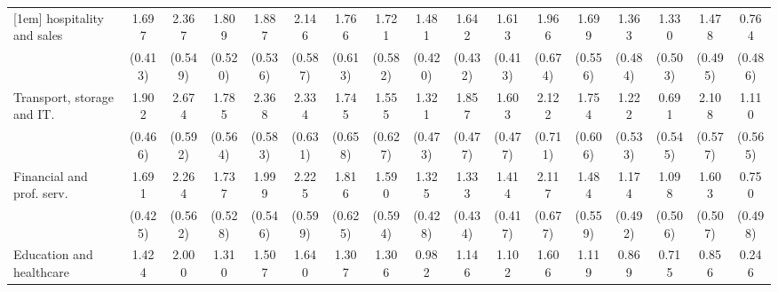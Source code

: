 {\begin{tabular}{l*{16}{c}}
[1em]
hospitality and sales&       1.697\sym{***}&       2.367\sym{***}&       1.809\sym{***}&       1.887\sym{***}&       2.146\sym{***}&       1.766\sym{**} &       1.721\sym{**} &       1.481\sym{***}&       1.642\sym{***}&       1.613\sym{***}&       1.966\sym{**} &       1.699\sym{**} &       1.363\sym{**} &       1.330\sym{**} &       1.478\sym{**} &       0.764         \\
                    &     (0.413)         &     (0.549)         &     (0.520)         &     (0.536)         &     (0.587)         &     (0.613)         &     (0.582)         &     (0.420)         &     (0.432)         &     (0.413)         &     (0.674)         &     (0.556)         &     (0.484)         &     (0.503)         &     (0.495)         &     (0.486)         \\
[1em]
Transport, storage and IT.&       1.902\sym{***}&       2.674\sym{***}&       1.785\sym{**} &       2.368\sym{***}&       2.334\sym{***}&       1.745\sym{**} &       1.555\sym{*}  &       1.321\sym{**} &       1.857\sym{***}&       1.603\sym{***}&       2.122\sym{**} &       1.754\sym{**} &       1.222\sym{*}  &       0.691         &       2.108\sym{***}&       1.110\sym{*}  \\
                    &     (0.466)         &     (0.592)         &     (0.564)         &     (0.583)         &     (0.631)         &     (0.658)         &     (0.627)         &     (0.473)         &     (0.477)         &     (0.477)         &     (0.711)         &     (0.606)         &     (0.533)         &     (0.545)         &     (0.577)         &     (0.565)         \\
[1em]
Financial and prof. serv.&       1.691\sym{***}&       2.264\sym{***}&       1.737\sym{**} &       1.999\sym{***}&       2.225\sym{***}&       1.816\sym{**} &       1.590\sym{**} &       1.325\sym{**} &       1.333\sym{**} &       1.414\sym{***}&       2.117\sym{**} &       1.484\sym{**} &       1.174\sym{*}  &       1.098\sym{*}  &       1.603\sym{**} &       0.750         \\
                    &     (0.425)         &     (0.562)         &     (0.528)         &     (0.546)         &     (0.599)         &     (0.625)         &     (0.594)         &     (0.428)         &     (0.434)         &     (0.417)         &     (0.677)         &     (0.559)         &     (0.492)         &     (0.506)         &     (0.507)         &     (0.498)         \\
[1em]
Education and healthcare&       1.424\sym{***}&       2.000\sym{***}&       1.310\sym{*}  &       1.507\sym{**} &       1.640\sym{**} &       1.307\sym{*}  &       1.306\sym{*}  &       0.982\sym{*}  &       1.146\sym{**} &       1.102\sym{**} &       1.606\sym{*}  &       1.119\sym{*}  &       0.869         &       0.715         &       0.856         &       0.246         \\

\end{tabular}}
